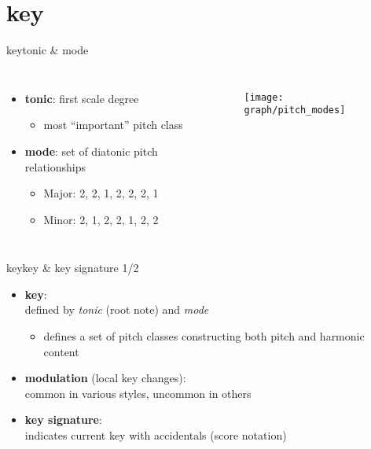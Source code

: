     \section{key}
        \begin{frame}{key}{tonic \& mode}
            \begin{columns}
            \begin{itemize}
                \item	\textbf{tonic}: first scale degree
                        \begin{itemize}
                            \item	most ``important'' pitch class
                        \end{itemize}
                
                \item	\textbf{mode}: set of diatonic pitch relationships
                        \begin{itemize}
                            \item	Major: 2, 2, 1, 2, 2, 2, 1
                            \item	Minor: 2, 1, 2, 2, 1, 2, 2
                        \end{itemize}
            \end{itemize}
                \vspace{-10mm}
                \begin{figure}[t]
                    \centering
                    \texttt{[image: graph/pitch\_modes]}
                \end{figure}
            \end{columns}

        \end{frame}
        
        \begin{frame}{key}{key \& key signature 1/2}
            \begin{itemize}
                \item	\textbf{key}:\\ defined by \textit{tonic} (root note) and \textit{mode}
                        
                        \begin{itemize}
                            \item<1->	defines a set of pitch classes constructing both  pitch and harmonic content
                            
                        \end{itemize}
                \bigskip        
                \item<2->	\textbf{modulation} (local key changes):\\ common in various styles, uncommon in others
                \bigskip        
                \item<3->	\textbf{key signature}:\\ indicates current key with accidentals (score notation)
            \end{itemize}
        \end{frame}
        

